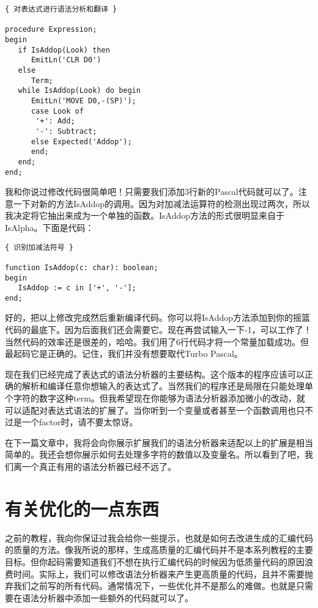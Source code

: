 \begin{verbatim}
{ 对表达式进行语法分析和翻译 }

procedure Expression;
begin
   if IsAddop(Look) then
      EmitLn('CLR D0')
   else
      Term;
   while IsAddop(Look) do begin
      EmitLn('MOVE D0,-(SP)');
      case Look of
       '+': Add;
       '-': Subtract;
      else Expected('Addop');
      end;
   end;
end;
\end{verbatim} 

我和你说过修改代码很简单吧！只需要我们添加3行新的Pascal代码就可以了。注意一下对新的方法IsAddop的调用。因为对加减法运算符的检测出现过两次，所以我决定将它抽出来成为一个单独的函数。IsAddop方法的形式很明显来自于IsAlpha。下面是代码：

\begin{verbatim}
{ 识别加减法符号 }

function IsAddop(c: char): boolean;
begin
   IsAddop := c in ['+', '-'];
end;
\end{verbatim}

好的，把以上修改完成然后重新编译代码。你可以将IsAddop方法添加到你的摇篮代码的最底下。因为后面我们还会需要它。现在再尝试输入一下-1，可以工作了！当然代码的效率还是很差的，哈哈。我们用了6行代码才将一个常量加载成功。但最起码它是正确的。记住，我们并没有想要取代Turbo Pascal。

现在我们已经完成了表达式的语法分析器的主要结构。这个版本的程序应该可以正确的解析和编译任意你想输入的表达式了。当然我们的程序还是局限在只能处理单个字符的数字这种term。但我希望现在你能够为语法分析器添加微小的改动，就可以适配对表达式语法的扩展了。当你听到一个变量或者甚至一个函数调用也只不过是一个factor时，请不要太惊讶。
                             
在下一篇文章中，我将会向你展示扩展我们的语法分析器来适配以上的扩展是相当简单的。我还会想你展示如何去处理多字符的数值以及变量名。所以看到了吧，我们离一个真正有用的语法分析器已经不远了。

\section{有关优化的一点东西}

之前的教程，我向你保证过我会给你一些提示，也就是如何去改进生成的汇编代码的质量的方法。像我所说的那样，生成高质量的汇编代码并不是本系列教程的主要目标。但你起码需要知道我们不想在执行汇编代码的时候因为低质量代码的原因浪费时间。实际上，我们可以修改语法分析器来产生更高质量的代码，且并不需要抛弃我们之前写的所有代码。通常情况下，一些优化并不是那么的难做。也就是只需要在语法分析器中添加一些额外的代码就可以了。

